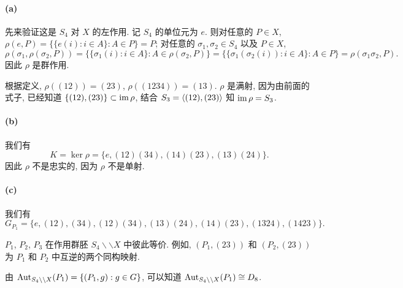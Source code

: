 \documentclass{article}
\begin{document}
\begin{solution}
	\paragraph{(a)} 先来验证这是 $S_4$ 对 $X$ 的左作用. 记 $S_4$ 的单位元为 $e$. 则对任意的 $P \in X$, $\rho(e,P) = \{\{e(i): i \in A\}: A \in P\} = P$; 对任意的 $\sigma_1, \sigma_2 \in S_4$ 以及 $P \in X$,
	\[ \rho(\sigma_1,\rho(\sigma_2,P)) = \{\{\sigma_1(i): i \in A\}: A \in \rho(\sigma_2, P)\} = \{\{\sigma_1(\sigma_2(i)): i \in A\}: A \in P\} = \rho(\sigma_1\sigma_2, P).  \]
	因此 $\rho$ 是群作用. 

	根据定义, $\rho((12)) = (23)$, $\rho((1234)) = (13)$. $\rho$ 是满射, 因为由前面的式子, 已经知道 $\{(12), (23)\} \subset \operatorname{im} \rho$, 结合 $S_3 = \left\langle (12), (23) \right\rangle$ 知 $\operatorname{im} \rho = S_3$. 

	\paragraph{(b)} 我们有
	\[ K = \ker \rho = \{e, (12)(34), (14)(23), (13)(24)\}.  \]
	因此 $\rho$ 不是忠实的, 因为 $\rho$ 不是单射. 

	\paragraph{(c)} 我们有
	\[ G_{P_1} = \{e, (12), (34), (12)(34), (13)(24), (14)(23), (1324), (1423)\}. \]

	$P_1$, $P_2$, $P_3$ 在作用群胚 $S_4 \backslash\backslash X$ 中彼此等价. 例如, $(P_1, (23))$ 和 $(P_2, (23))$ 为 $P_1$ 和 $P_2$ 中互逆的两个同构映射. 

	由 $\operatorname{Aut}_{S_4 \backslash\backslash X}(P_1) = \{(P_1, g): g \in G\}$, 可以知道 $\operatorname{Aut}_{S_4 \backslash\backslash X}(P_1) \cong D_{8}$.
\end{solution}
\end{document}
